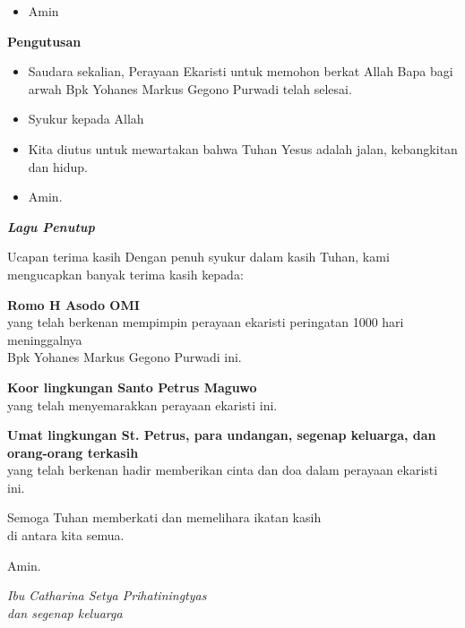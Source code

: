 \documentclass[a5paper,titlepage,10pt,openany]{scrbook}
\makeatletter
\newcommand{\subjudul}[1]{%
  {\parindent \z@ 
    \interlinepenalty\@M \bfseries #1\par\nobreak \vskip 10\p@ }}
\newcommand{\lagu}[1]{%
  {\parindent \z@ 
    \interlinepenalty\@M \slshape \bfseries \normalsize \textit{#1}\par\nobreak \vskip 10\p@ }}
\newcommand{\BU}[1]{\begin{itemize} \item[U:] #1 \end{itemize}}
\newcommand{\BI}[1]{\begin{itemize} \item[I:] #1 \end{itemize}}
\newcommand{\namaalm}{Bpk Yohanes Markus Gegono Purwadi }
\newcommand{\namaromo}{H Asodo OMI}
\makeatother
\begin{document}
\BU{Amin}

 

\subjudul{Pengutusan}

\BI{Saudara sekalian, Perayaan Ekaristi untuk memohon 
berkat Allah Bapa bagi arwah \namaalm telah selesai.}

\BU{Syukur kepada Allah}

\BI{Kita diutus untuk mewartakan bahwa Tuhan Yesus adalah 
jalan, kebangkitan dan hidup.}

\BU{Amin.}

 

\lagu{Lagu Penutup}
 

\newpage
\begin{flushright}
{\Large Ucapan terima kasih}
\noindent Dengan penuh syukur dalam kasih Tuhan, kami mengucapkan banyak
terima kasih kepada:
\large

\textbf{Romo \namaromo}\\
yang telah berkenan mempimpin perayaan ekaristi peringatan 1000 hari meninggalnya\\ \namaalm
ini.

\textbf{Koor lingkungan Santo Petrus Maguwo}\\
yang telah menyemarakkan perayaan ekaristi ini.

\textbf{Umat lingkungan St. Petrus, para undangan, segenap keluarga, dan orang-orang terkasih}\\
yang telah berkenan hadir memberikan cinta dan doa dalam perayaan
ekaristi ini.

Semoga Tuhan memberkati dan memelihara ikatan kasih\\ di antara kita semua.

Amin.

\bigskip 

\textit{Ibu Catharina Setya Prihatiningtyas\\
dan segenap keluarga}
\end{flushright}
\end{document}
